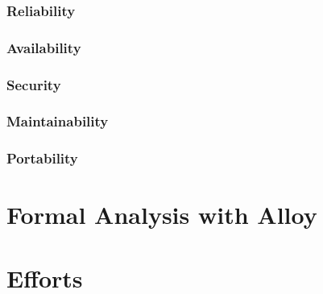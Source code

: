 \documentclass{article}
\begin{document}
\subsubsection{Reliability}
\subsubsection{Availability}
\subsubsection{Security}
\subsubsection{Maintainability}
\subsubsection{Portability}

\section{Formal Analysis with Alloy}

\section{Efforts}




    
\end{document}

